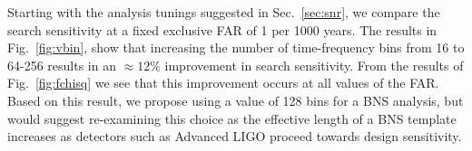 Starting with the analysis tunings suggested in Sec.~\ref{sec:snr}, we compare the search sensitivity at a fixed exclusive FAR of 1 per 1000 years. The results in Fig.~\ref{fig:vbin}, show that increasing the number of time-frequency bins from 16 to 64-256 results in an $\approx 12\%$ improvement in search sensitivity. From the results of Fig.~\ref{fig:fchisq} we see  that this improvement occurs at all values of the FAR. Based on this result, we propose using a value of 128 bins for a BNS analysis, but would suggest re-examining this choice as the effective length of a BNS template increases as detectors such as Advanced LIGO proceed towards design sensitivity.






